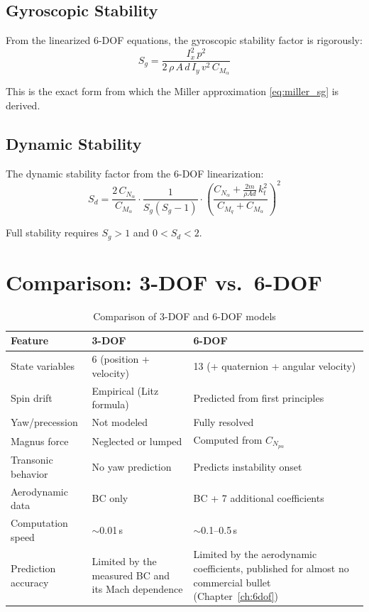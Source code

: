 \documentclass[11pt,twoside,openright]{report}
\begin{document}
\subsection{Gyroscopic Stability}

From the linearized 6-DOF equations, the gyroscopic stability factor is rigorously:
\begin{equation}
  S_g = \frac{I_x^2\,p^2}{2\,\rho\,A\,d\,I_y\,v^2\,C_{M_\alpha}}
  \label{eq:sg_6dof}
\end{equation}

This is the exact form from which the Miller approximation \eqref{eq:miller_sg} is derived.

\subsection{Dynamic Stability}

The dynamic stability factor from the 6-DOF linearization:
\begin{equation}
  S_d = \frac{2\,C_{N_\alpha}}{C_{M_\alpha}}\cdot\frac{1}{S_g(S_g-1)}\cdot\left(\frac{C_{N_\alpha} + \frac{2m}{\rho A d}\,k_t^2}{C_{M_q}+C_{M_{\dot{\alpha}}}}\right)^2
  \label{eq:sd_6dof}
\end{equation}

Full stability requires $S_g > 1$ and $0 < S_d < 2$.

\section{Comparison: 3-DOF vs.\ 6-DOF}

\begin{table}[H]
\centering
\caption{Comparison of 3-DOF and 6-DOF models}
\label{tab:3dof_vs_6dof}
\begin{tabularx}{\textwidth}{@{}lXX@{}}
\toprule
\textbf{Feature} & \textbf{3-DOF} & \textbf{6-DOF} \\
\midrule
State variables & 6 (position + velocity) & 13 (+ quaternion + angular velocity) \\
Spin drift & Empirical (Litz formula) & Predicted from first principles \\
Yaw/precession & Not modeled & Fully resolved \\
Magnus force & Neglected or lumped & Computed from $C_{N_{p\alpha}}$ \\
Transonic behavior & No yaw prediction & Predicts instability onset \\
Aerodynamic data & BC only & BC + 7 additional coefficients \\
Computation speed & $\sim$0.01\,s & $\sim$0.1--0.5\,s \\
Prediction accuracy & Limited by the measured BC and its Mach dependence & Limited by the aerodynamic coefficients, published for almost no commercial bullet (Chapter~\ref{ch:6dof}) \\
\bottomrule
\end{tabularx}
\end{table}
\end{document}
